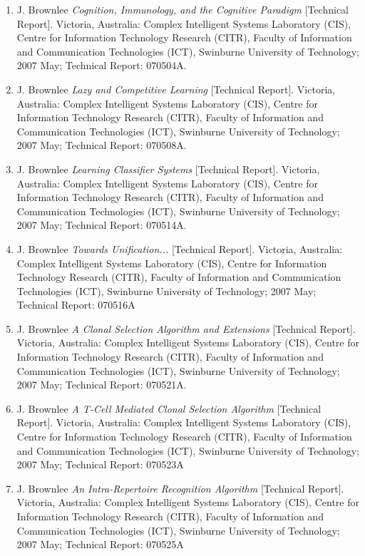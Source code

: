 \begin{enumerate}
	\item J. Brownlee \emph{Cognition, Immunology, and the Cognitive Paradigm} [Technical Report]. Victoria, Australia: Complex Intelligent Systems Laboratory (CIS), Centre for Information Technology Research (CITR), Faculty of Information and Communication Technologies (ICT), Swinburne University of Technology; 2007 May; Technical Report: 070504A.
	\item J. Brownlee \emph{Lazy and Competitive Learning} [Technical Report]. Victoria, Australia: Complex Intelligent Systems Laboratory (CIS), Centre for Information Technology Research (CITR), Faculty of Information and Communication Technologies (ICT), Swinburne University of Technology; 2007 May; Technical Report: 070508A.
	\item J. Brownlee \emph{Learning Classifier Systems} [Technical Report]. Victoria, Australia: Complex Intelligent Systems Laboratory (CIS), Centre for Information Technology Research (CITR), Faculty of Information and Communication Technologies (ICT), Swinburne University of Technology; 2007 May; Technical Report: 070514A.
	\item J. Brownlee \emph{Towards Unification...} [Technical Report]. Victoria, Australia: Complex Intelligent Systems Laboratory (CIS), Centre for Information Technology Research (CITR), Faculty of Information and Communication Technologies (ICT), Swinburne University of Technology; 2007 May; Technical Report: 070516A
	\item J. Brownlee \emph{A Clonal Selection Algorithm and Extensions} [Technical Report]. Victoria, Australia: Complex Intelligent Systems Laboratory (CIS), Centre for Information Technology Research (CITR), Faculty of Information and Communication Technologies (ICT), Swinburne University of Technology; 2007 May; Technical Report: 070521A.
	\item J. Brownlee \emph{A T-Cell Mediated Clonal Selection Algorithm} [Technical Report]. Victoria, Australia: Complex Intelligent Systems Laboratory (CIS), Centre for Information Technology Research (CITR), Faculty of Information and Communication Technologies (ICT), Swinburne University of Technology; 2007 May; Technical Report: 070523A
	\item J. Brownlee \emph{An Intra-Repertoire Recognition Algorithm} [Technical Report]. Victoria, Australia: Complex Intelligent Systems Laboratory (CIS), Centre for Information Technology Research (CITR), Faculty of Information and Communication Technologies (ICT), Swinburne University of Technology; 2007 May; Technical Report: 070525A

\end{enumerate}
